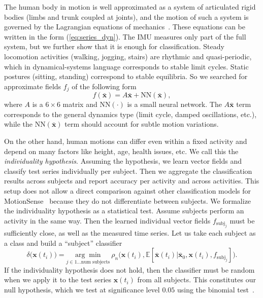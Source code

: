 \documentclass[referee, pdflatex, sn-mathphys-num]{sn-jnl}
\theoremstyle{definition}
\theoremstyle{plain}
\newcommand{\bx}{\ensuremath{\mathbf{x}}}
\newcommand{\bbx}{\ensuremath{\bar{\mathbf{x}}}}
\begin{document}
	The human body in motion is well approximated as a system of articulated rigid bodies (limbs and trunk coupled at joints), and the motion of such a system is governed by the Lagrangian equations of mechanics~\cite{winter2009biomechanics, passive_dyn_walk}. These equations can be written in the form (\ref{eq:series_dyn}). The IMU measures only part of the full system, but we further show that it is enough for classification. Steady locomotion activities (walking, jogging, stairs) are rhythmic and quasi-periodic, which in dynamical-systems language corresponds to stable limit cycles. Static postures (sitting, standing) correspond to stable equilibria. So we searched for approximate fields $f_j$ of the following form
	\begin{equation*}
		f(\bbx) = A \bbx + \text{NN}(\bbx),
	\end{equation*}
	where $A$ is a $6\times6$ matrix and $\text{NN}(\cdot)$ is a small neural network. The $A \bbx$ term corresponds to the general dynamics type (limit cycle, damped oscillations, etc.), while the $ \text{NN}(\bbx)$ term should account for subtle motion variations.
	
	On the other hand, human motions can differ even within a fixed activity and depend on many factors like height, age, health issues, etc. We call this the \emph{individuality hypothesis}. Assuming the hypothesis, we learn vector fields and classify test series individually per subject. Then we aggregate the classification results across subjects and report accuracy per activity and across activities. This setup does not allow a direct comparison against other classification models for MotionSense~\cite{10585302, 10585303} because they do not differentiate between subjects. We formalize the individuality hypothesis as a statistical test. Assume subjects perform an activity in the same way. Then the learned individual vector fields $f_{\text{subj}_j}$ must be sufficiently close, as well as the measured time series. Let us take each subject as a class and build a ``subject'' classifier
	\begin{equation}\label{def:subj_classifier}
		\delta \big( \bx(t_i) \big) = \underset{j \in 1 \ldots \text{num subjects}}{\arg\min} \ \rho_n\big( \bx(t_i), \mathbb{E}[\bbx(t_i) | \bbx_0, \bx(t_i), f_{\text{subj}_j}] \big).
	\end{equation}
	If the individuality hypothesis does not hold, then the classifier must be random when we apply it to the test series $\bx(t_i)$ from all subjects. This constitutes our null hypothesis, which we test at significance level $0.05$ using the binomial test~\cite{hogg2005introduction}.
	
\end{document}
